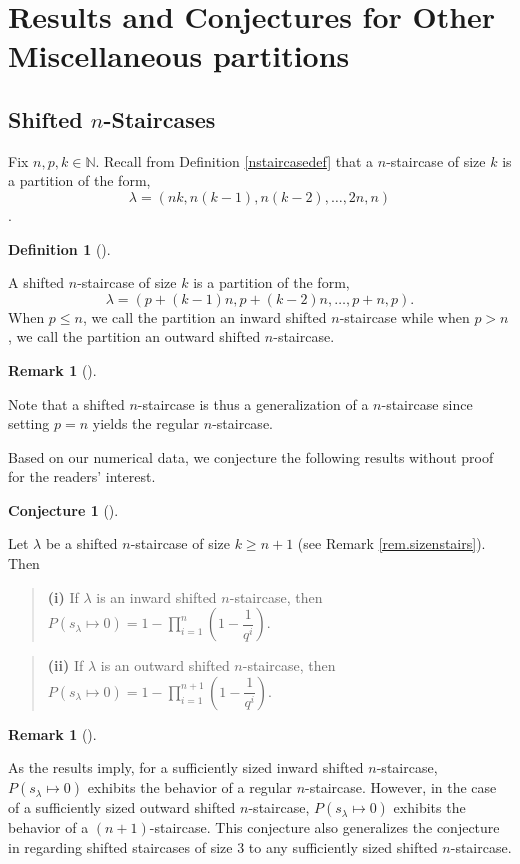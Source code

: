 \documentclass[numbers=enddot,12pt,final,onecolumn,notitlepage]{scrartcl}%
\theoremstyle{definition}
\newtheorem{defi}[theo]{Definition}
\newenvironment{definition}[1][]
{\begin{defi}[#1]\begin{leftbar}}
{\end{leftbar}\end{defi}}
\newtheorem{remk}[theo]{Remark}
\newenvironment{remark}[1][]
{\begin{remk}[#1]\begin{leftbar}}
{\end{leftbar}\end{remk}}
\newtheorem{conj}[theo]{Conjecture}
\newenvironment{conjecture}[1][]
{\begin{conj}[#1]\begin{leftbar}}
{\end{leftbar}\end{conj}}
\newenvironment{statement}{\begin{quote}}{\end{quote}}
\let\prodnonlimits\prod
\renewcommand{\prod}{\prodnonlimits\limits}
\newcommand{\NN}{\mathbb{N}}
\renewcommand{\leq}{\leqslant}
\renewcommand{\geq}{\geqslant}
\theoremstyle{plainsl}
\begin{document}
\section{Results and Conjectures for Other Miscellaneous partitions}
\subsection{Shifted $n$-Staircases}
Fix $n,p,k \in \NN$. Recall from Definition \ref{nstaircasedef} that a $n$-staircase of size $k$ is a partition of the form,
\[\lambda = (nk, n(k-1), n(k-2), \ldots,2n, n) \].

\begin{definition}
\label{shifted}
A shifted $n$-staircase of size $k$ is a partition of the form, 
\[
\lambda = (p+(k-1)n, p+(k-2)n, \ldots,p+n, p) .
\]
When $p \leq n$, we call the partition an inward shifted $n$-staircase while when  $p > n$, we call the partition an outward shifted $n$-staircase.

\end{definition}

\begin{remark}
Note that a shifted $n$-staircase is thus a generalization of a $n$-staircase since setting $p=n$ yields the regular $n$-staircase.
\end{remark}

Based on our numerical data, we conjecture the following results without proof for the readers' interest. 

\begin{conjecture}
Let $\lambda$ be a shifted $n$-staircase of size $k\geq n+1$ (see Remark \ref{rem.sizenstairs}). Then 

\begin{statement}
\textbf{(i)} If $\lambda$ is an inward shifted $n$-staircase, then $P(s_{\lambda} \longmapsto 0) = 1-\prod_{i=1}^{n} \left(  1-\dfrac{1}{q^{i}}\right)$.
\end{statement}
\begin{statement}
\textbf{(ii)} If $\lambda$ is an outward shifted $n$-staircase, then $P(s_{\lambda} \longmapsto 0) = 1-\prod_{i=1}^{n+1} \left(  1-\dfrac{1}{q^{i}}\right)$.
\end{statement}

\end{conjecture}
\begin{remark}
As the results imply, for a sufficiently sized inward shifted $n$-staircase, $P(s_{\lambda} \longmapsto 0)$ exhibits the behavior of a regular $n$-staircase. However, in the case of a sufficiently sized outward shifted $n$-staircase, $P(s_{\lambda} \longmapsto 0)$ exhibits the behavior of a $(n+1)$-staircase. This conjecture also generalizes the conjecture in \cite{Anzis18} regarding shifted staircases of size $3$ to any sufficiently sized shifted $n$-staircase.
\end{remark}
\end{document}
